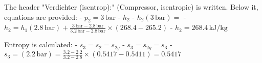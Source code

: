The header "Verdichter (isentrop):" (Compressor, isentropic) is written. Below it, equations are provided:  
- \( p_2 = 3 \, \text{bar} \)  
- \( h_2 \)  
- \( h_2 (3 \, \text{bar}) = \)  
- \( h_2 = h_1 (2.8 \, \text{bar}) + \frac{3 \, \text{bar} - 2.8 \, \text{bar}}{3.2 \, \text{bar} - 2.8 \, \text{bar}} \times (268.4 - 265.2) \)  
- \( h_2 = 268.4 \, \text{kJ/kg} \)  

Entropy is calculated:  
- \( s_3 = s_2 = s_{2g} \)  
- \( s_3 = s_{2g} = s_3 \)  
- \( s_3 = (2.2 \, \text{bar}) = \frac{3.2 - 2.2}{3.2 - 2.8} \times (0.5417 - 0.5411) = 0.5417 \)